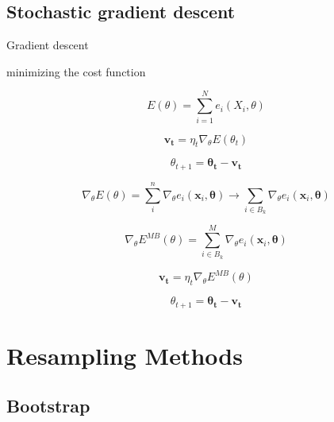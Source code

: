 \documentclass[a4paper,12pt, english]{article}
\begin{document}
\subsection{Stochastic gradient descent}

Gradient descent 

minimizing the cost function

\begin{equation}
E(\theta) = \sum_{i=1}^N e_i(X_i, \theta) 
\end{equation}

\begin{equation}
\mathbf{v_t} = \eta_t \nabla_{\theta} E(\theta_t)
\end{equation}

\begin{equation}
\theta_{t+1} = \mathbf{\theta_t} - \mathbf{v_t}
\end{equation}

\begin{equation}
\nabla_{\theta} E(\theta) = \sum_i^n \nabla_{\theta} e_i(\mathbf{x}_i, \mathbf{\theta}) \longrightarrow \sum_{i \in B_k} \nabla_{\theta} e_i(\mathbf{x}_i, \mathbf{\theta})
\end{equation}

\begin{equation}
\nabla_{\theta} E^{MB} (\theta) = \sum_{i \in B_k}^M \nabla_{\theta} e_i(\mathbf{x}_i, \mathbf{\theta})
\end{equation}

\begin{equation}
\mathbf{v_t} = \eta_t \nabla_{\theta} E^{MB} (\theta)
\end{equation}

\begin{equation}
\theta_{t+1} = \mathbf{\theta_t} - \mathbf{v_t}
\end{equation}

\section{Resampling Methods}

\subsection{Bootstrap}
\end{document}
